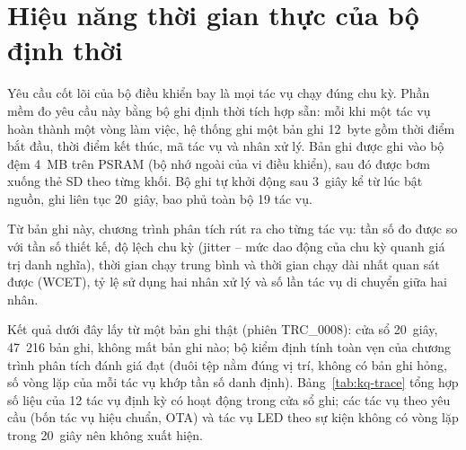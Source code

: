 \section{Hiệu năng thời gian thực của bộ định thời}\label{sec:kq-rtos}

Yêu cầu cốt lõi của bộ điều khiển bay là mọi tác vụ chạy đúng chu kỳ. Phần mềm đo yêu cầu này bằng bộ ghi định thời tích hợp sẵn: mỗi khi một tác vụ hoàn thành một vòng làm việc, hệ thống ghi một bản ghi 12~byte gồm thời điểm bắt đầu, thời điểm kết thúc, mã tác vụ và nhân xử lý. Bản ghi được ghi vào bộ đệm 4~MB trên PSRAM (bộ nhớ ngoài của vi điều khiển), sau đó được bơm xuống thẻ SD theo từng khối. Bộ ghi tự khởi động sau 3~giây kể từ lúc bật nguồn, ghi liên tục 20~giây, bao phủ toàn bộ 19 tác vụ.

Từ bản ghi này, chương trình phân tích rút ra cho từng tác vụ: tần số đo được so với tần số thiết kế, độ lệch chu kỳ (jitter -- mức dao động của chu kỳ quanh giá trị danh nghĩa), thời gian chạy trung bình và thời gian chạy dài nhất quan sát được (WCET), tỷ lệ sử dụng hai nhân xử lý và số lần tác vụ di chuyển giữa hai nhân.

Kết quả dưới đây lấy từ một bản ghi thật (phiên TRC\_0008): cửa sổ 20~giây, 47~216 bản ghi, không mất bản ghi nào; bộ kiểm định tính toàn vẹn của chương trình phân tích đánh giá đạt (đuôi tệp nằm đúng vị trí, không có bản ghi hỏng, số vòng lặp của mỗi tác vụ khớp tần số danh định). Bảng~\ref{tab:kq-trace} tổng hợp số liệu của 12 tác vụ định kỳ có hoạt động trong cửa sổ ghi; các tác vụ theo yêu cầu (bốn tác vụ hiệu chuẩn, OTA) và tác vụ LED theo sự kiện không có vòng lặp trong 20~giây nên không xuất hiện.

